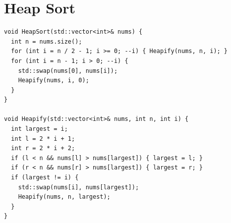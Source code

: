 \section{Heap Sort}\label{sec:heap_sort}
\begin{lstlisting}
void HeapSort(std::vector<int>& nums) {
  int n = nums.size();
  for (int i = n / 2 - 1; i >= 0; --i) { Heapify(nums, n, i); }
  for (int i = n - 1; i > 0; --i) {
    std::swap(nums[0], nums[i]);
    Heapify(nums, i, 0);
  }
}

void Heapify(std::vector<int>& nums, int n, int i) {
  int largest = i;
  int l = 2 * i + 1;
  int r = 2 * i + 2;
  if (l < n && nums[l] > nums[largest]) { largest = l; }
  if (r < n && nums[r] > nums[largest]) { largest = r; }
  if (largest != i) {
    std::swap(nums[i], nums[largest]);
    Heapify(nums, n, largest);
  }
}
\end{lstlisting}